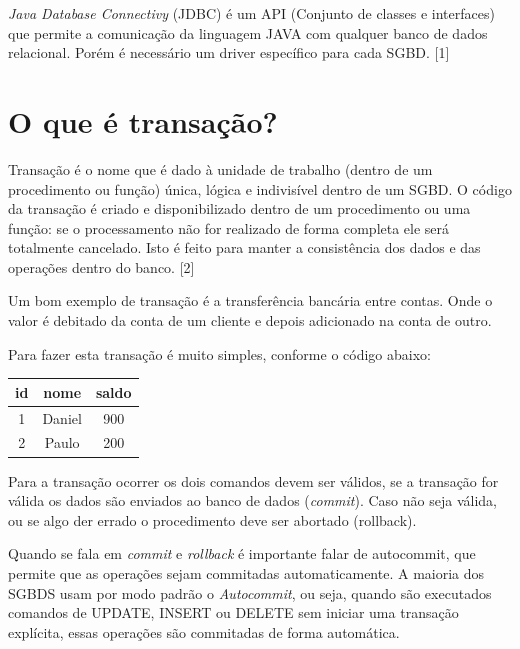 \documentclass[12pt,a4paper]{article}
\begin{document}
\textit{Java Database Connectivy} (JDBC) é um API (Conjunto de classes e interfaces) que permite a comunicação da linguagem JAVA com qualquer banco de dados relacional. Porém é necessário um driver específico para cada SGBD.  [1]

\section{O que é transação? }

Transação é o nome que é dado à unidade de trabalho (dentro de um procedimento ou função) única, lógica e indivisível dentro de um SGBD. O código da transação é criado e disponibilizado dentro de um procedimento ou uma função: se o processamento não for realizado de forma completa ele será totalmente cancelado. Isto é feito para manter a consistência dos dados e das operações dentro do banco. [2]

Um bom exemplo de transação é a transferência bancária entre contas. Onde o valor é debitado da conta de um cliente e depois adicionado na conta de outro. 

Para fazer esta transação é muito simples, conforme o código abaixo:
\begin{center}



\begin{tabular}{|c|c|c|}
\hline 
id & nome & saldo \\ 
\hline 
1 & Daniel & 900 \\ 
\hline 
2 & Paulo & 200 \\ 
\hline 
\end{tabular} 
\end{center}

 
 
 
Para a transação ocorrer os dois comandos devem ser válidos, se a transação for válida os dados são enviados ao banco de dados (\textit{commit}). Caso não seja válida, ou se algo der errado o procedimento deve ser abortado (rollback). 

Quando se fala em \textit{commit} e \textit{rollback} é importante falar de autocommit, que permite que as operações sejam commitadas automaticamente. A maioria dos SGBDS usam por modo padrão o \textit{Autocommit}, ou seja, quando são executados comandos de UPDATE, INSERT ou DELETE sem iniciar uma transação explícita, essas operações são commitadas de forma automática.
\newpage

	
\end{document}
